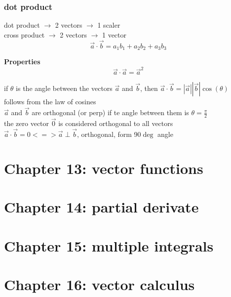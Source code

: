 \documentclass{article}
\begin{document}
\subsubsection{dot product}
dot product $\rightarrow$  2 vectors $\rightarrow$ 1 scaler \\
cross product $\rightarrow$  2 vectors $\rightarrow$ 1 vector \\

\[\vec{a} \cdot \vec{b} = a_1b_1+a_2b_2+a_3b_3\]

\textbf{Properties}
\[\vec{a} \cdot \vec{a} = \vec{a}^2\]

if $\theta$ is the angle between the vectors $\vec{a}$ and $\vec{b}$, then $\vec{a} \cdot \vec{b} =|\vec{a}||\vec{b}|\cos(\theta)$ \\

follows from the law of cosines \\

$\vec{a}$ and $\vec{b}$ are orthogonal (or perp) if te angle between them is $\theta=\frac{\pi}{2}$ \\

the zero vector $\vec{0}$ is considered orthogonal to all vectors \\

$\vec{a} \cdot \vec{b} = 0 <=> \vec{a} \perp \vec{b}$, orthogonal, form 90$\deg$ angle

\section{Chapter 13: vector functions}

\section{Chapter 14: partial derivate}

\section{Chapter 15: multiple integrals}

\section{Chapter 16: vector calculus}
\end{document}
